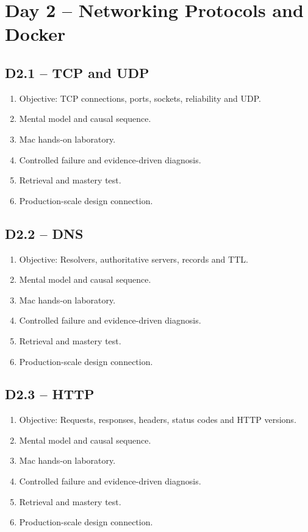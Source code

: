 \documentclass[11pt,a4paper]{book}
\begin{document}
\chapter{Day 2 -- Networking Protocols and Docker}
\section{D2.1 -- TCP and UDP}
\begin{enumerate}
\item Objective: TCP connections, ports, sockets, reliability and UDP.
\item Mental model and causal sequence.
\item Mac hands-on laboratory.
\item Controlled failure and evidence-driven diagnosis.
\item Retrieval and mastery test.
\item Production-scale design connection.
\end{enumerate}
\section{D2.2 -- DNS}
\begin{enumerate}
\item Objective: Resolvers, authoritative servers, records and TTL.
\item Mental model and causal sequence.
\item Mac hands-on laboratory.
\item Controlled failure and evidence-driven diagnosis.
\item Retrieval and mastery test.
\item Production-scale design connection.
\end{enumerate}
\section{D2.3 -- HTTP}
\begin{enumerate}
\item Objective: Requests, responses, headers, status codes and HTTP versions.
\item Mental model and causal sequence.
\item Mac hands-on laboratory.
\item Controlled failure and evidence-driven diagnosis.
\item Retrieval and mastery test.
\item Production-scale design connection.
\end{enumerate}
\end{document}
